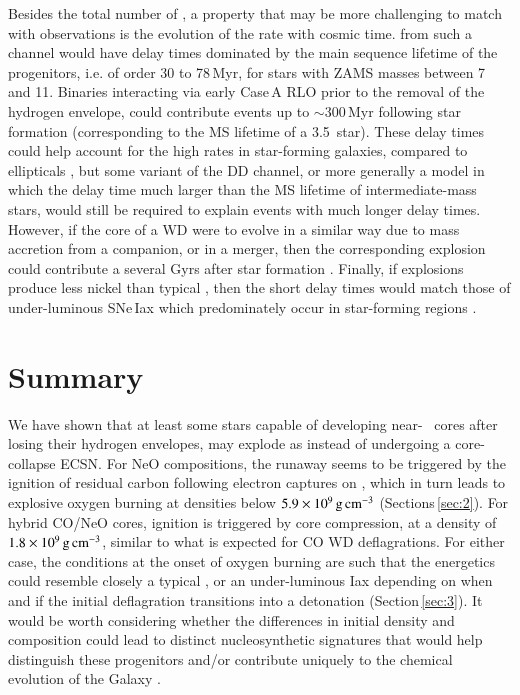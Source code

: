 \documentclass[twocolumn]{aa}
\begin{document}
Besides the total number of \ias, a property that may be more challenging to match with observations is the evolution of the \ia rate with cosmic time. \ias from such a channel would have delay times dominated by the main sequence lifetime of the progenitors, i.e. of order 30 to 78\,Myr, for stars with ZAMS masses between 7 and 11\msun. Binaries interacting via early Case\,A RLO prior to the removal of the hydrogen envelope, could contribute events up to $\sim 300$\,Myr following star formation (corresponding to the MS lifetime of a 3.5\msun\ star). 
These delay times could help account for the high \ia rates in star-forming galaxies, compared to ellipticals \citep{Maoz:2010pz,claeys2014}, but some variant of the DD channel, or more generally a model in which the delay time much larger than the MS lifetime of intermediate-mass stars, would still be required to explain events with much longer delay times.  
 However,  if the \one core of a WD  were to evolve in a similar way due to 
mass accretion from a companion, or in a merger, then the corresponding explosion could contribute a \ia several Gyrs after star formation \citep[see also][and references therein]{marquardt2015,Schwab:2015bma,Jones:2016asr,Schwab:2017epw,Schwab:2018cnb,kashyap2018,augustine2019}. 
Finally, if \one explosions produce less nickel than typical \ias, then the short delay times would match those of under-luminous SNe\,Iax which predominately occur in star-forming regions \citep{Jha:2017gwq}. 


\section{Summary}\label{sec:5}
We have shown that at least some stars capable of developing near-\mch~ \one cores 
after losing their hydrogen  envelopes, may explode as \ias instead of 
undergoing a core-collapse  ECSN. For NeO compositions, the runaway seems to be triggered by the ignition of 
residual carbon following electron captures on , which in turn 
leads to explosive oxygen burning at densities below $5.9\times 10^{9}\mathrm{\,g\,cm^{-3}}$ (Sections\,\ref{sec:2}). 
For hybrid CO/NeO cores, ignition is triggered by core compression, at a density of $1.8\times10^{9}\mathrm{\,g\,cm^{-3}}$, similar to what is expected for CO WD deflagrations. For either case, the conditions at the onset of oxygen burning are such that the energetics  could resemble closely a typical \ia, or an under-luminous Iax depending on when and if the initial deflagration transitions into a detonation (Section\,\ref{sec:3}). 
It would be worth considering whether the differences in initial density and 
composition could lead to distinct nucleosynthetic signatures that would help 
distinguish these progenitors and/or contribute uniquely to the chemical 
evolution of the Galaxy \citep[in analogy to ][for ECSNe]{Jones:2018ule}.
\end{document}
